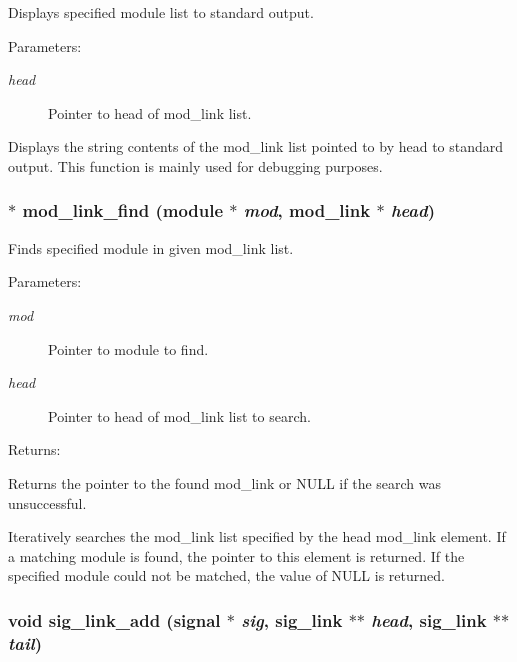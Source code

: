 Displays specified module list to standard output.

\begin{Desc}
\item[Parameters: ]\par
\begin{description}
\item[{\em 
head}]Pointer to head of mod\_\-link list.\end{description}
\end{Desc}
Displays the string contents of the mod\_\-link list pointed to by head to standard output. This function is mainly used for debugging purposes. 
\subsubsection{$\ast$ mod\_\-link\_\-find ({\bf module} $\ast$ {\em mod}, {\bf mod\_\-link} $\ast$ {\em head})}\label{link_8h_a11}


Finds specified module in given mod\_\-link list.

\begin{Desc}
\item[Parameters: ]\par
\begin{description}
\item[{\em 
mod}]Pointer to module to find. \item[{\em 
head}]Pointer to head of mod\_\-link list to search.\end{description}
\end{Desc}
\begin{Desc}
\item[Returns: ]\par
Returns the pointer to the found mod\_\-link or NULL if the search was unsuccessful.\end{Desc}
Iteratively searches the mod\_\-link list specified by the head mod\_\-link element. If a matching module is found, the pointer to this element is returned. If the specified module could not be matched, the value of NULL is returned. 
\subsubsection{\setlength{\rightskip}{0pt plus 5cm}void sig\_\-link\_\-add ({\bf signal} $\ast$ {\em sig}, {\bf sig\_\-link} $\ast$$\ast$ {\em head}, {\bf sig\_\-link} $\ast$$\ast$ {\em tail})}\label{link_8h_a2}


